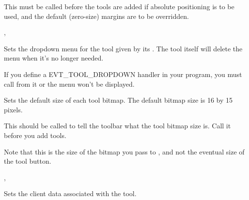 
This must be called before the tools are added if absolute positioning is to be used, and the
default (zero-size) margins are to be overridden.


, 


\label{wxtoolbarsetdropdownmenu}


Sets the dropdown menu for the tool given by its . The tool itself will
delete the menu when it's no longer needed.

If you define a EVT\_TOOL\_DROPDOWN handler in your program, you must call 
 from it or the menu won't be displayed.


\label{wxtoolbarsettoolbitmapsize}


Sets the default size of each tool bitmap. The default bitmap size is 16 by 15 pixels.




This should be called to tell the toolbar what the tool bitmap size is. Call
it before you add tools.

Note that this is the size of the bitmap you pass to ,
and not the eventual size of the tool button.


,\rtfsp
{}


\label{wxtoolbarsettoolclientdata}


Sets the client data associated with the tool.


\label{wxtoolbarsettooldisabledbitmap}


